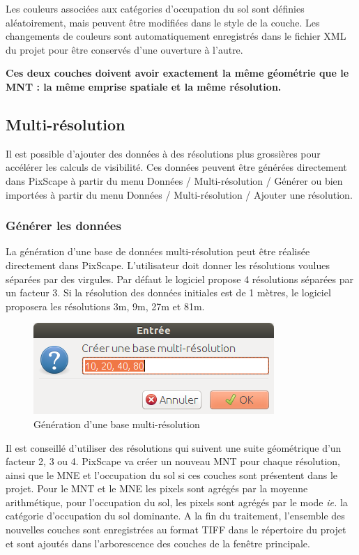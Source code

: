 \documentclass{report}
\begin{document}
Les couleurs associées aux catégories d'occupation du sol sont définies aléatoirement, mais peuvent être modifiées dans le style de la couche. Les changements de couleurs sont automatiquement enregistrés dans le fichier XML du projet pour être conservés d'une ouverture à l'autre.

\textbf{Ces deux couches doivent avoir exactement la même géométrie que le MNT : la même emprise spatiale et la même résolution.} 

\subsection{Multi-résolution}
Il est possible d'ajouter des données à des résolutions plus grossières pour accélérer les calculs de visibilité. Ces données peuvent être générées directement dans PixScape à partir du menu Données / Multi-résolution / Générer ou bien importées à partir du menu Données / Multi-résolution / Ajouter une résolution.

\subsubsection{Générer les données}
La génération d'une base de données multi-résolution peut être réalisée directement dans PixScape. L'utilisateur doit donner les résolutions voulues séparées par des virgules. Par défaut le logiciel propose 4 résolutions séparées par un facteur 3. Si la résolution des données initiales est de 1 mètres, le logiciel proposera les résolutions 3m, 9m, 27m et 81m.

\begin{figure}[H]
	\includegraphics[scale=0.5]{img/gen_ms-fr.png} 
	\caption{Génération d'une base multi-résolution}
\end{figure}

Il est conseillé d'utiliser des résolutions qui suivent une suite géométrique d'un facteur 2, 3 ou 4.
PixScape va créer un nouveau MNT pour chaque résolution, ainsi que le MNE et l'occupation du sol si ces couches sont présentent dans le projet.
Pour le MNT et le MNE les pixels sont agrégés par la moyenne arithmétique, pour l'occupation du sol, les pixels sont agrégés par le mode \textit{ie.} la catégorie d'occupation du sol dominante.
A la fin du traitement, l'ensemble des nouvelles couches sont enregistrées au format TIFF dans le répertoire du projet et sont ajoutés dans l'arborescence des couches de la fenêtre principale.
\end{document}
